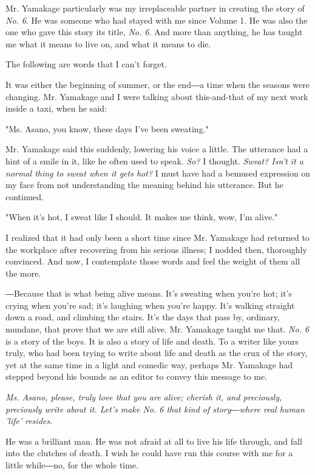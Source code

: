 Mr. Yamakage particularly was my irreplaceable partner in creating the
story of \emph{No. 6}. He was someone who had stayed with me since Volume 1. He
was also the one who gave this story its title, \emph{No. 6}. And more than
anything, he has taught me what it means to live on, and what it means
to die.

The following are words that I can't forget.

It was either the beginning of summer, or the end―a time when the
seasons were changing. Mr. Yamakage and I were talking about
this-and-that of my next work inside a taxi, when he said:

"Ms. Asano, you know, these days I've been sweating."

Mr. Yamakage said this suddenly, lowering his voice a little. The
utterance had a hint of a smile in it, like he often used to speak. \emph{So?}
I thought. \emph{Sweat? Isn't it a normal thing to sweat when it gets hot?} I
must have had a bemused expression on my face from not understanding the
meaning behind his utterance. But he continued.

"When it's hot, I sweat like I should. It makes me think, wow, I'm
alive."

I realized that it had only been a short time since Mr. Yamakage had
returned to the workplace after recovering from his serious illness; I
nodded then, thoroughly convinced. And now, I contemplate those words
and feel the weight of them all the more.

―Because that is what being alive means. It's sweating when you're hot;
it's crying when you're sad; it's laughing when you're happy. It's
walking straight down a road, and climbing the stairs. It's the days
that pass by, ordinary, mundane, that prove that we are still alive. Mr.
Yamakage taught me that. \emph{No. 6} is a story of the boys. It is also a
story of life and death. To a writer like yours truly, who had been
trying to write about life and death as the crux of the story, yet at
the same time in a light and comedic way, perhaps Mr. Yamakage had
stepped beyond his bounds as an editor to convey this message to me.

\emph{Ms. Asano, please, truly love that you are alive; cherish it, and
preciously, preciously write about it. Let's make \emph{No. 6} that kind of
story―where real human 'life' resides.}

He was a brilliant man. He was not afraid at all to live his life
through, and fall into the clutches of death. I wish he could have run
this course with me for a little while―no, for the whole time.

